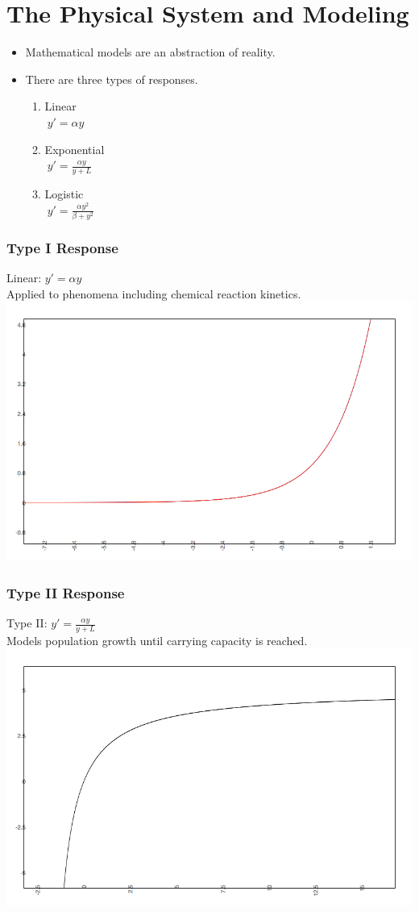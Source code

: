 
\section{The Physical System and Modeling}
\begin{frame}
  \begin{itemize}
	\item Mathematical models are an abstraction of reality.
	\item There are three types of responses. 
	\begin{enumerate}
		\item Linear\\
		$\ y'=\alpha y$
		\item Exponential\\
		$\ y' = \frac{\alpha y}{y+ L}$ 
		\item Logistic\\
		$\ y'= \frac {\alpha y^2}{\beta + y^2}$
	\end{enumerate}
  \end{itemize}
\end{frame}

\begin{frame}
  \frametitle{Type I Response}
   Linear: $y'=\alpha y$\\ Applied to phenomena including chemical reaction kinetics.
   \includegraphics[scale=.4]{typeI}
\end{frame}

\begin{frame}
  \frametitle{Type II Response} 
    Type II: $y'=\frac{\alpha y}{y+L}$\\Models population growth until carrying capacity is reached.
   \includegraphics[natwidth=162bp, natheight=227bp,width=280bp]{typeII.jpg}
\end{frame}

